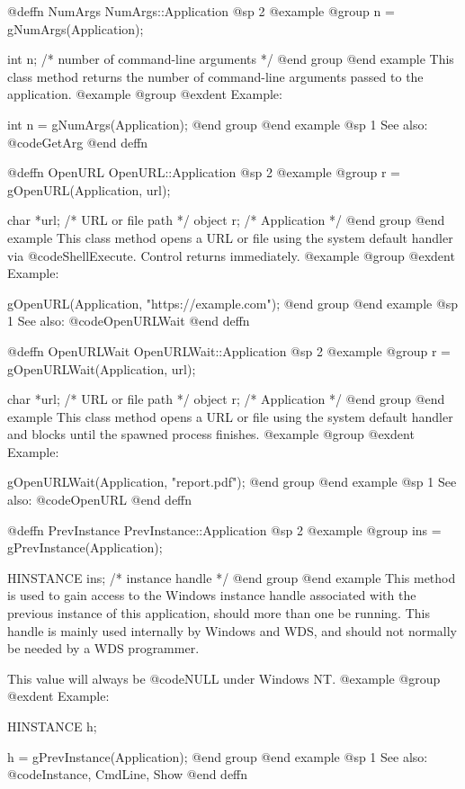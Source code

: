 @deffn {NumArgs} NumArgs::Application
@sp 2
@example
@group
n = gNumArgs(Application);

int     n;      /*  number of command-line arguments  */
@end group
@end example
This class method returns the number of command-line arguments
passed to the application.
@example
@group
@exdent Example:

int n = gNumArgs(Application);
@end group
@end example
@sp 1
See also:  @code{GetArg}
@end deffn



@deffn {OpenURL} OpenURL::Application
@sp 2
@example
@group
r = gOpenURL(Application, url);

char    *url;   /*  URL or file path  */
object  r;      /*  Application       */
@end group
@end example
This class method opens a URL or file using the system default
handler via @code{ShellExecute}.  Control returns immediately.
@example
@group
@exdent Example:

gOpenURL(Application, "https://example.com");
@end group
@end example
@sp 1
See also:  @code{OpenURLWait}
@end deffn



@deffn {OpenURLWait} OpenURLWait::Application
@sp 2
@example
@group
r = gOpenURLWait(Application, url);

char    *url;   /*  URL or file path  */
object  r;      /*  Application       */
@end group
@end example
This class method opens a URL or file using the system default
handler and blocks until the spawned process finishes.
@example
@group
@exdent Example:

gOpenURLWait(Application, "report.pdf");
@end group
@end example
@sp 1
See also:  @code{OpenURL}
@end deffn



@deffn {PrevInstance} PrevInstance::Application
@sp 2
@example
@group
ins = gPrevInstance(Application);

HINSTANCE  ins;    /*  instance handle   */
@end group
@end example
This method is used to gain access to the Windows instance handle
associated with the previous instance of this application, should more
than one be running.  This handle is mainly used internally by Windows
and WDS, and should not normally be needed by a WDS programmer.

This value will always be @code{NULL} under Windows NT.
@example
@group
@exdent Example:

HINSTANCE  h;

h = gPrevInstance(Application);
@end group
@end example
@sp 1
See also:  @code{Instance, CmdLine, Show}
@end deffn



